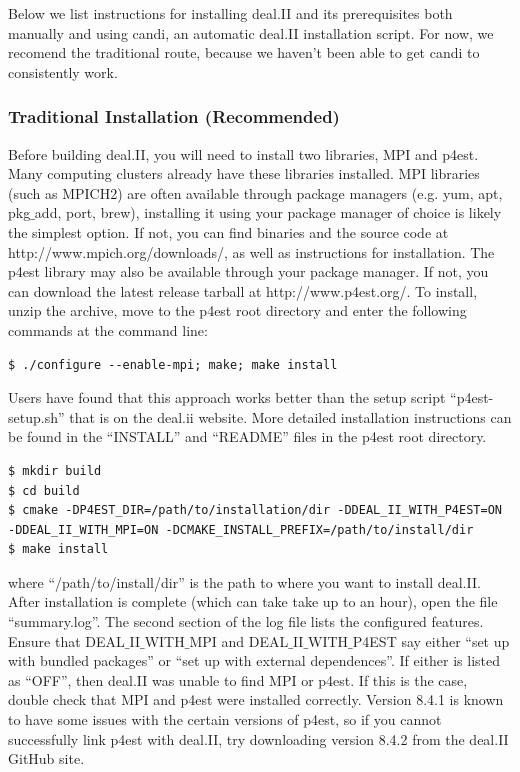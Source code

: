 \documentclass[10pt]{article} %
\begin{document}
Below we list instructions for installing deal.II and its prerequisites both manually and using candi, an automatic deal.II installation script. For now, we recomend the traditional route, because we haven't been able to get candi to consistently work.

\subsubsection{Traditional Installation (Recommended)}
Before building deal.II, you will need to install two libraries, MPI and p4est. Many computing clusters already have these libraries installed. MPI libraries (such as MPICH2) are often available through package managers (e.g. yum, apt, pkg$\_$add, port, brew), installing it using your package manager of choice is likely the simplest option. If not, you can find binaries and the source code at http://www.mpich.org/downloads/, as well as instructions for installation. The p4est library may also be available through your package manager. If not, you can download the latest release tarball at http://www.p4est.org/. To install, unzip the archive, move to the p4est root directory and enter the following commands at the command line:
\begin{lstlisting}
$ ./configure --enable-mpi; make; make install
\end{lstlisting}
Users have found that this approach works better than the setup script ``p4est-setup.sh'' that is on the deal.ii website. More detailed installation instructions can be found in the ``INSTALL'' and ``README'' files in the p4est root directory.

\begin{lstlisting}
$ mkdir build
$ cd build
$ cmake -DP4EST_DIR=/path/to/installation/dir -DDEAL_II_WITH_P4EST=ON 
-DDEAL_II_WITH_MPI=ON -DCMAKE_INSTALL_PREFIX=/path/to/install/dir
$ make install
\end{lstlisting}
where ``/path/to/install/dir'' is the path to where you want to install deal.II. After installation is complete (which can take take up to an hour), open the file ``summary.log''. The second section of the log file lists the configured features. Ensure that DEAL$\_$II$\_$WITH$\_$MPI and DEAL$\_$II$\_$WITH$\_$P4EST say either ``set up with bundled packages'' or ``set up with external dependences''. If either is listed as ``OFF'', then deal.II was unable to find MPI or p4est. If this is the case, double check that MPI and p4est were installed correctly. Version 8.4.1 is known to have some issues with the certain versions of p4est, so if you cannot successfully link p4est with deal.II, try downloading version 8.4.2 from the deal.II GitHub site.
\end{document}
